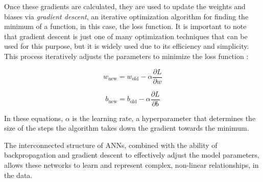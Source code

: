 Once these gradients are calculated, they are used to update the weights and biases via \textit{gradient descent}, an iterative optimization algorithm for finding the minimum of a function, in this case, the loss function. It is important to note that gradient descent is just one of many optimization techniques that can be used for this purpose, but it is widely used due to its efficiency and simplicity. This process iteratively adjusts the parameters to minimize the loss function \cite{ruder2016overview}:

\[
w_{\text{new}} = w_{\text{old}} - \alpha \frac{\partial L}{\partial w}
\]

\[
b_{\text{new}} = b_{\text{old}} - \alpha \frac{\partial L}{\partial b}
\]

In these equations, $ \alpha $ is the learning rate, a hyperparameter that determines the size of the steps the algorithm takes down the gradient towards the minimum.

The interconnected structure of ANNs, combined with the ability of backpropagation and gradient descent to effectively adjust the model parameters, allows these networks to learn and represent complex, non-linear relationships, in the data.
